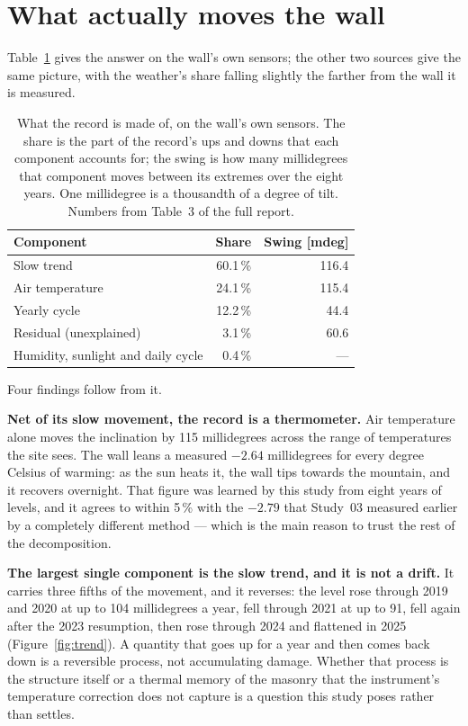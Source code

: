 \documentclass[11pt,a4paper]{article}
\begin{document}
\section{What actually moves the wall}

Table~\ref{tab:summary-shares} gives the answer on the wall's own sensors; the
other two sources give the same picture, with the weather's share falling
slightly the farther from the wall it is measured.

\begin{table}[H]
\centering
\caption{What the record is made of, on the wall's own sensors. The share is the
part of the record's ups and downs that each component accounts for; the swing is
how many millidegrees that component moves between its extremes over the eight
years. One millidegree is a thousandth of a degree of tilt. Numbers from
Table~3 of the full report.}
\label{tab:summary-shares}
\begin{tabular}{lrr}
\toprule
Component & Share & Swing [mdeg] \\
\midrule
Slow trend                          & 60.1\,\% & 116.4 \\
Air temperature                     & 24.1\,\% & 115.4 \\
Yearly cycle                        & 12.2\,\% & 44.4 \\
Residual (unexplained)              & 3.1\,\%  & 60.6 \\
Humidity, sunlight and daily cycle  & 0.4\,\%  & --- \\
\bottomrule
\end{tabular}
\end{table}

Four findings follow from it.

\textbf{Net of its slow movement, the record is a thermometer.} Air temperature
alone moves the inclination by 115 millidegrees across the range of temperatures
the site sees. The wall leans a measured $-2.64$ millidegrees for every degree
Celsius of warming: as the sun heats it, the wall tips towards the mountain, and
it recovers overnight. That figure was learned by this study from eight years of
levels, and it agrees to within 5\,\% with the $-2.79$ that Study~03 measured
earlier by a completely different method --- which is the main reason to trust
the rest of the decomposition.

\textbf{The largest single component is the slow trend, and it is not a drift.}
It carries three fifths of the movement, and it reverses: the level rose through
2019 and 2020 at up to 104 millidegrees a year, fell through 2021 at up to 91,
fell again after the 2023 resumption, then rose through 2024 and flattened in
2025 (Figure~\ref{fig:trend}). A quantity that goes up for a year and then comes
back down is a reversible process, not accumulating damage. Whether that process
is the structure itself or a thermal memory of the masonry that the instrument's
temperature correction does not capture is a question this study poses rather
than settles.
\end{document}
